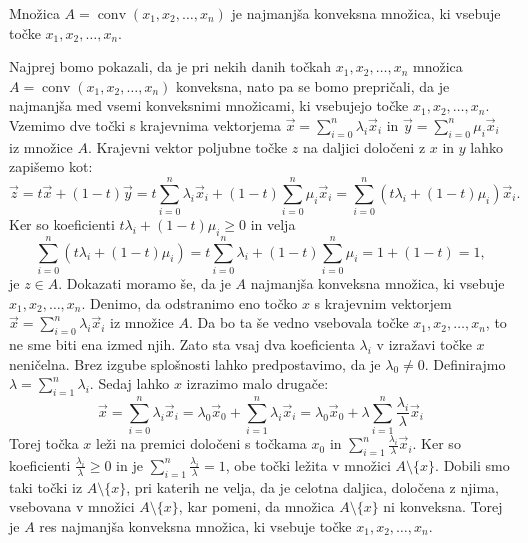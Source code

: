 \documentclass[mat1]{fmfdelo}
\DeclareMathOperator{\conv}{conv}
\newcommand{\0}{\underline{0}}
\begin{document}
\begin{trditev}\label{trd:min-conv}
Množica $A = \conv(x_1, x_2, \dots, x_n)$ je najmanjša konveksna množica, ki vsebuje točke $x_1, x_2, \dots, x_n$.
\end{trditev}
\begin{dokaz}
Najprej bomo pokazali, da je pri nekih danih točkah $x_1, x_2, \dots, x_n$ množica $A = \conv(x_1, x_2, \dots, x_n)$ konveksna, nato pa se bomo prepričali, da je najmanjša med vsemi konveksnimi množicami, ki vsebujejo točke $x_1, x_2, \dots, x_n$. Vzemimo dve točki s krajevnima vektorjema $\vec{x} = \sum\limits_{i=0}^n \lambda_i \vec{x}_i$ in $\vec{y} = \sum\limits_{i=0}^n \mu_i \vec{x}_i$ iz množice $A$. Krajevni vektor poljubne točke $z$ na daljici določeni z $x$ in $y$ lahko zapišemo kot:
$$\vec{z} = t \vec{x} + (1-t) \vec{y} = t \sum\limits_{i=0}^n \lambda_i \vec{x}_i + (1 - t) \sum\limits_{i=0}^n \mu_i \vec{x}_i = \sum\limits_{i=0}^n (t \lambda_i + (1 - t) \mu_i) \vec{x}_i.$$
Ker so koeficienti $t \lambda_i + (1 - t) \mu_i \geq 0$ in velja 
$$\sum\limits_{i=0}^n (t \lambda_i + (1 - t) \mu_i) = t \sum\limits_{i=0}^n \lambda_i + (1 - t) \sum\limits_{i=0}^n \mu_i = 1 + (1 - t) = 1,$$
je $z \in A$.
Dokazati moramo še, da je $A$ najmanjša konveksna množica, ki vsebuje $x_1, x_2, \dots, x_n$. Denimo, da odstranimo eno točko $x$ s krajevnim vektorjem $\vec{x} = \sum\limits_{i=0}^n \lambda_i \vec{x}_i$ iz množice $A$. Da bo ta še vedno vsebovala točke $x_1, x_2, \dots, x_n$, to ne sme biti ena izmed njih. Zato sta vsaj dva koeficienta $\lambda_i$ v izražavi točke $x$ neničelna. Brez izgube splošnosti lahko predpostavimo, da je $\lambda_0 \neq 0$. Definirajmo $\lambda =  \sum\limits_{i=1}^n \lambda_i$. Sedaj lahko $x$ izrazimo malo drugače:
$$\vec{x} = \sum\limits_{i=0}^n \lambda_i \vec{x}_i = \lambda_0 \vec{x}_0 + \sum\limits_{i=1}^n \lambda_i \vec{x}_i = \lambda_0 \vec{x}_0 + \lambda \sum\limits_{i=1}^n \frac{\lambda_i}{\lambda} \vec{x}_i$$
Torej točka $x$ leži na premici določeni s točkama $x_0$ in $\sum\limits_{i=1}^n \frac{\lambda_i}{\lambda} \vec{x}_i$. Ker so koeficienti $\frac{\lambda_i}{\lambda} \geq 0$ in je $\sum\limits_{i=1}^n \frac{\lambda_i}{\lambda} = 1$, obe točki ležita v množici $A \setminus \{ x \}$. Dobili smo taki točki iz $A \setminus \{ x \}$, pri katerih ne velja, da je celotna daljica, določena z njima, vsebovana v množici $A \setminus \{ x \}$, kar pomeni, da množica $A \setminus \{ x \}$ ni konveksna. Torej je $A$ res najmanjša konveksna množica, ki vsebuje točke $x_1, x_2, \dots, x_n$.
\end{dokaz}
\end{document}
